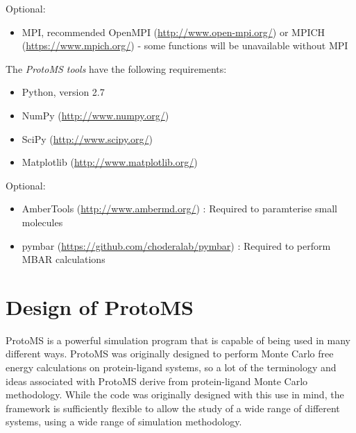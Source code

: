 \documentclass[letterpaper,10pt,english]{sphinxmanual}
\begin{document}
Optional:
\begin{itemize}
\item {} 
MPI, recommended OpenMPI (\href{http://www.open-mpi.org/}{http://www.open-mpi.org/})  or MPICH (\href{https://www.mpich.org/}{https://www.mpich.org/}) - some functions will be unavailable without MPI

\end{itemize}

The \emph{ProtoMS tools} have the following requirements:
\begin{itemize}
\item {} 
Python, version 2.7

\item {} 
NumPy (\href{http://www.numpy.org/}{http://www.numpy.org/})

\item {} 
SciPy (\href{http://www.scipy.org/}{http://www.scipy.org/})

\item {} 
Matplotlib (\href{http://www.matplotlib.org/}{http://www.matplotlib.org/})

\end{itemize}

Optional:
\begin{itemize}
\item {} 
AmberTools (\href{http://www.ambermd.org/}{http://www.ambermd.org/})          : Required to paramterise small molecules

\item {} 
pymbar (\href{https://github.com/choderalab/pymbar}{https://github.com/choderalab/pymbar}) : Required to perform MBAR calculations

\end{itemize}


\chapter{Design of ProtoMS}
\label{protoms:design-of-protoms}\label{protoms::doc}
ProtoMS is a powerful simulation program that is capable of being used in many different ways. ProtoMS was originally designed to perform Monte Carlo free energy calculations on protein-ligand systems, so a lot of the terminology and ideas associated with ProtoMS derive from protein-ligand Monte Carlo methodology. While the code was originally designed with this use in mind, the framework is sufficiently flexible to allow the study of a wide range of different systems, using a wide range of simulation methodology.
\end{document}
